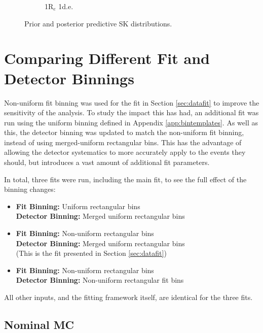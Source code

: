 \begin{figure}[!htbp]
\begin{subfigure}{.49\textwidth}
   \caption{1R$_{e}$ 1d.e.}
  \label{fig:skppnue1pi}
\end{subfigure}
\caption{Prior and posterior predictive SK distributions.}
\label{fig:skpp}
\end{figure}

\section{Comparing Different Fit and Detector Binnings}\label{sec:newbin}

Non-uniform fit binning was used for the fit in Section \ref{sec:datafit} to improve the sensitivity of the analysis. To study the impact this has had, an additional fit was run using the uniform binning defined in Appendix \ref{app:bintemplates}. As well as this, the detector binning was updated to match the non-uniform fit binning, instead of using merged-uniform rectangular bins. This has the advantage of allowing the detector systematics to more accurately apply to the events they should, but introduces a vast amount of additional fit parameters.

In total, three fits were run, including the main fit, to see the full effect of the binning changes:

\begin{itemize}

\item \textbf{Fit Binning: } Uniform rectangular bins\\
\textbf{Detector Binning: } Merged uniform rectangular bins

\item \textbf{Fit Binning: } Non-uniform rectangular bins\\
\textbf{Detector Binning: } Merged uniform rectangular bins\\
(This is the fit presented in Section \ref{sec:datafit})

\item \textbf{Fit Binning: } Non-uniform rectangular bins\\
\textbf{Detector Binning: } Non-uniform rectangular fit bins

\end{itemize}

All other inputs, and the fitting framework itself, are identical for the three fits.

\subsection{Nominal MC}

